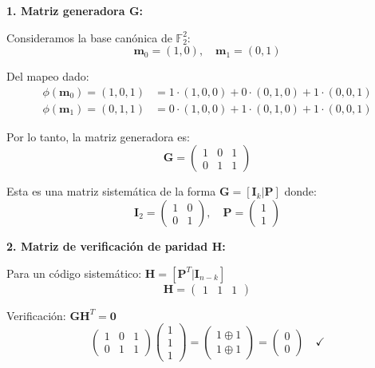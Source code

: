 \documentclass[10pt,a4paper]{article}
\begin{document}
\begin{solucion}
\textbf{1. Matriz generadora $\mathbf{G}$:}

Consideramos la base canónica de $\mathbb{F}_2^2$:
\[
\mathbf{m}_0 = (1, 0), \quad \mathbf{m}_1 = (0, 1)
\]

Del mapeo dado:
\begin{align*}
\phi(\mathbf{m}_0) = (1,0,1) &= 1 \cdot (1,0,0) + 0 \cdot (0,1,0) + 1 \cdot (0,0,1)\\
\phi(\mathbf{m}_1) = (0,1,1) &= 0 \cdot (1,0,0) + 1 \cdot (0,1,0) + 1 \cdot (0,0,1)
\end{align*}

Por lo tanto, la matriz generadora es:
\[
\boxed{\mathbf{G} = \begin{pmatrix} 1 & 0 & 1 \\ 0 & 1 & 1 \end{pmatrix}}
\]

Esta es una matriz sistemática de la forma $\mathbf{G} = [\mathbf{I}_k | \mathbf{P}]$ donde:
\[
\mathbf{I}_2 = \begin{pmatrix} 1 & 0 \\ 0 & 1 \end{pmatrix}, \quad
\mathbf{P} = \begin{pmatrix} 1 \\ 1 \end{pmatrix}
\]

\textbf{2. Matriz de verificación de paridad $\mathbf{H}$:}

Para un código sistemático: $\mathbf{H} = [\mathbf{P}^T | \mathbf{I}_{n-k}]$
\[
\boxed{\mathbf{H} = \begin{pmatrix} 1 & 1 & 1 \end{pmatrix}}
\]

Verificación: $\mathbf{G} \mathbf{H}^T = \mathbf{0}$
\[
\begin{pmatrix} 1 & 0 & 1 \\ 0 & 1 & 1 \end{pmatrix} \begin{pmatrix} 1 \\ 1 \\ 1 \end{pmatrix} = \begin{pmatrix} 1 \oplus 1 \\ 1 \oplus 1 \end{pmatrix} = \begin{pmatrix} 0 \\ 0 \end{pmatrix} \quad \checkmark
\]


\end{solucion}
\end{document}
